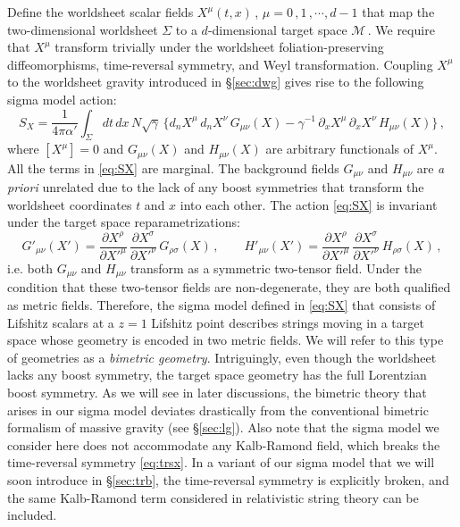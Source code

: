 \documentclass[11pt]{article}
\newcommand{\be}{\begin{equation}}
\newcommand{\ee}{\end{equation}}
\newcommand{\CM}{\mathcal{M}}
\newcommand{\p}{\partial}
\begin{document}
Define the worldsheet scalar fields $X^\mu (t, x)$\,, $\mu = 0\,, 1\,, \cdots, d-1$ that map the two-dimensional worldsheet $\Sigma$ to a $d$-dimensional target space $\CM$\,. We require that $X^\mu$ transform trivially under the worldsheet foliation-preserving diffeomorphisms, time-reversal symmetry, and Weyl transformation. Coupling $X^\mu$ to the worldsheet gravity introduced in \S\ref{sec:dwg} gives rise to the following sigma model action:
%
\be \label{eq:SX}
	S_X = \frac{1}{4\pi\alpha'} \int_\Sigma dt \, dx \, N \sqrt{\gamma} \, \Big\{ d_n X^\mu \, d_n X^\nu \, G_{\mu\nu} (X) - \gamma^{-1} \, \p_x X^\mu \, \p_x X^\nu \, H_{\mu\nu} (X) \Bigr\}\,,
\ee
%
where $[X^\mu] = 0$ and $G_{\mu\nu} (X)$ and $H_{\mu\nu} (X)$ are arbitrary functionals of $X^\mu$. All the terms in \eqref{eq:SX} are marginal. The background fields $G_{\mu\nu}$ and $H_{\mu\nu}$ are \emph{a priori} unrelated due to the lack of any boost symmetries that transform the worldsheet coordinates $t$ and $x$ into each other. The action \eqref{eq:SX} is invariant under the target space reparametrizations:
%
\be \label{eq:GHtransf}
	G'_{\mu\nu} (X') = \frac{\p X^\rho}{\p {X'}^\mu} \, \frac{\p X^\sigma}{\p {X'}^\nu} \, G_{\rho\sigma} (X)\,,
		\qquad
	H'_{\mu\nu} (X') = \frac{\p X^\rho}{\p {X'}^\mu} \, \frac{\p X^\sigma}{\p {X'}^\nu} \, H_{\rho\sigma} (X)\,,
\ee
%
i.e. both $G_{\mu\nu}$ and $H_{\mu\nu}$ transform as a symmetric two-tensor field. Under the condition that these two-tensor fields are non-degenerate, they are both qualified as metric fields. Therefore, the sigma model defined in \eqref{eq:SX} that consists of Lifshitz scalars at a $z=1$ Lifshitz point describes strings moving in a target space whose geometry is encoded in two metric fields. We will refer to this type of geometries as a \emph{bimetric geometry}. Intriguingly, even though the worldsheet lacks any boost symmetry, the target space geometry has the full Lorentzian boost symmetry. As we will see in later discussions, the bimetric theory that arises in our sigma model deviates drastically from the conventional bimetric formalism of massive gravity \cite{Hassan:2011zd} (see \S\ref{sec:lg}). Also note that the sigma model we consider here does not accommodate any Kalb-Ramond field, which breaks the time-reversal symmetry \eqref{eq:trsx}. In a variant of our sigma model that we will soon introduce in \S\ref{sec:trb}, the time-reversal symmetry is explicitly broken, and the same Kalb-Ramond term considered in relativistic string theory can be included. 
\end{document}
